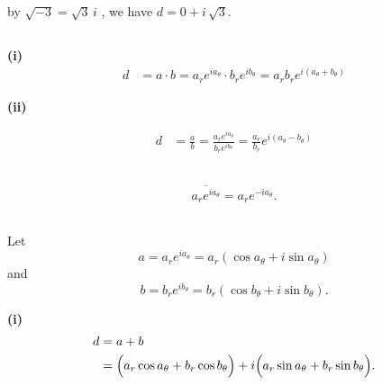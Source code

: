 \documentclass[12pt]{article}
\begin{document}
\subsection{} %
by $\sqrt{-3} = \sqrt{3}\,i$ , we have $d = 0 + i\,\sqrt{3}$. 

\subsection{} %
\textbf{(i)} 
\begin{equation}
\begin{aligned}
d &= a \cdot b = a_r e^{i a_\theta} \cdot b_r e^{i b_\theta} = a_r b_r e^{i(a_\theta + b_\theta)}
\end{aligned}
\end{equation}


\textbf{(ii)} 

\begin{equation}
\begin{aligned}
d &=  \frac{a}{b} = \frac{a_r e^{i a_\theta}}{ b_r e^{i b_\theta}} =  \frac{a_r}{b_r} e^{i(a_\theta - b_\theta)}
\end{aligned}
\end{equation}

\subsection{} %
\begin{equation}
\begin{aligned}
\overline{a_r e^{i a_\theta}} = a_r e^{-i a_\theta}.
\end{aligned}
\end{equation}

\subsection{}

Let 
\[
a = a_r e^{i a_\theta} = a_r (\cos a_\theta + i\sin a_\theta)
\]
and
\[
b = b_r e^{i b_\theta} = b_r (\cos b_\theta + i\sin b_\theta).
\]

\textbf{(i)}
\begin{equation}
\begin{aligned}
d &= a + b\\
& = \Bigl(a_r\cos a_\theta + b_r\cos b_\theta\Bigr) + i\Bigl(a_r\sin a_\theta + b_r\sin b_\theta\Bigr).
\end{aligned}
\end{equation}
\end{document}
